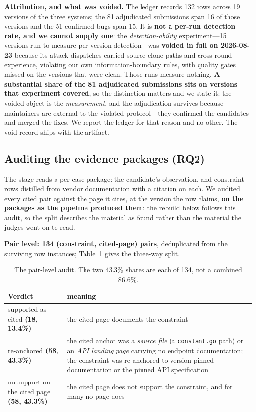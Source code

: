 \documentclass[acmsmall,screen,review,anonymous]{acmart}
\begin{document}
\textbf{Attribution, and what was voided.} The ledger records 132 rows across 19 versions of the
three systems; the 81 adjudicated submissions span 16 of those versions and the 51 confirmed bugs
span 15. It is \textbf{not a per-run detection rate, and we cannot supply one}: the
\emph{detection-ability} experiment---15 versions run to measure per-version detection---was
\textbf{voided in full on 2026-08-23} because its attack dispatches carried source-clone paths and
cross-round experience, violating our own information-boundary rules, with quality gates missed on
the versions that were clean. Those runs measure nothing. \textbf{A substantial share of the 81
adjudicated submissions sits on versions that experiment covered}, so the distinction matters and we
state it: the voided object is the \emph{measurement}, and the adjudication survives because
maintainers are external to the violated protocol---they confirmed the candidates and merged the
fixes. We report the ledger for that reason and no other. The void record ships with the artifact.

\subsection{Auditing the evidence packages (RQ2)}
\label{sec:audit}

The stage reads a per-case package: the candidate's observation, and constraint rows distilled from
vendor documentation with a citation on each. We audited every cited pair against the page it cites,
at the version the row claims, \textbf{on the packages as the pipeline produced them}: the rebuild
below follows this audit, so the split describes the material as found rather than the material the
judges went on to read.

\textbf{Pair level: 134 (constraint, cited-page) pairs}, deduplicated from the surviving row
instances; Table~\ref{tab:pairaudit} gives the three-way split.

\begin{table}[t]
\caption{The pair-level audit. The two 43.3\% shares are each of 134, not a combined 86.6\%.}
\label{tab:pairaudit}
\footnotesize
\begin{tabular}{@{}lp{}@{}}
\toprule
Verdict & meaning \\
\midrule
supported as cited \textbf{(18, 13.4\%)} & the cited page documents the constraint \\
re-anchored \textbf{(58, 43.3\%)} & the cited anchor was a \emph{source file} (a
\texttt{constant.go} path) or an \emph{API landing page} carrying no endpoint documentation; the
constraint was re-anchored to version-pinned documentation or the pinned API specification \\
no support on the cited page \textbf{(58, 43.3\%)} & the cited page does not support the constraint,
and for many no page does \\
\bottomrule
\end{tabular}
\end{table}
\end{document}
